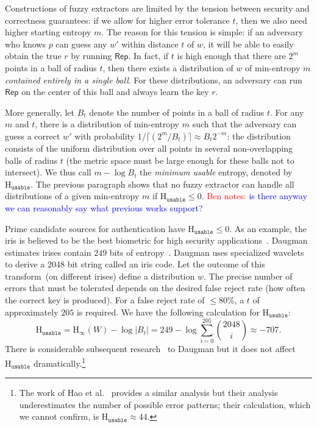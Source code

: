 \documentclass[11pt]{article}
\newcommand{\class}[1]{{\ensuremath{\mathsf{#1}}}}
\newcommand{\rep}{\ensuremath{\class{Rep}}\xspace}
\newcommand{\Hoo}{\mathrm{H}_\infty}
\newcommand{\Huse}{\mathrm{H}_{\mathtt{usable}}}
\newcommand{\authnote}[2]{{\textcolor{red}{\textsf{#1 notes: }\textcolor{blue}{ #2}}\marginpar{\textcolor{red}{\textbf{!!!!!}}}}}
\newcommand{\authnote}[2]{}
\newcommand{\bnote}[1]{{\authnote{Ben}{#1}}}
\begin{document}
Constructions of fuzzy extractors are limited by the tension between security and correctness guarantees: if we allow for higher error tolerance $t$, then we also need higher starting entropy $m$. The reason for this tension is simple: if an adversary who knows $p$ can guess any $w'$ within distance $t$ of $w$, it will be able to easily obtain the true $r$ by running $\rep$.
In fact, if $t$ is high enough that there are $2^m$ points in a ball of radius $t$, then there exists a distribution of $w$ of min-entropy $m$  \emph{contained entirely in a single ball}.  For these distributions, an adversary can run $\rep$ on the center of this ball and always learn the key $r$.


More generally, let $B_t$ denote the number of points in a ball of radius $t$. For any $m$ and $t$, there is a distribution of min-entropy $m$ such that the adversary can guess a correct $w'$ with probability $1/\lceil( 2^m/B_t) \rceil\approx B_t 2^{-m}$: the distribution consists of the uniform distribution over all points in several non-overlapping balls of radius $t$ (the metric space must be large enough for these balls not to intersect). We thus call $m-\log B_t$ the \emph{minimum usable} entropy, denoted by $\Huse$. The previous paragraph shows that  no fuzzy extractor can handle all distributions of a given min-entropy $m$ if  $\Huse\le 0$.
\bnote{is there anyway we can reasonably say what previous works support?}

Prime candidate sources for authentication have $\Huse\le 0$.  As an example, the iris is believed to be the best biometric for high security applications~\cite{prabhakar2003biometric}.  Daugman estimates irises contain $249$ bits of entropy~\cite{daugman2004}.  Daugman uses specialized wavelets to derive a $2048$ bit string called an iris code.  Let the outcome of this transform~(on different irises) define a distribution $w$.  The precise number of errors that must be tolerated depends on the desired false reject rate (how often the correct key is produced).  For a false reject rate of $\le 80\%$, a $t$ of approximately $205$ is required.  We have the following calculation for $\Huse$:
\[
\Huse = \Hoo(W) - \log |B_t|
= 249 - \log \sum_{i=0}^{205} {2048 \choose i} \approx -707.
\]
There is considerable subsequent research~\cite{gentile2009slic,gentile2009efficient,rathgeb2011combining} to Daugman but it does not affect $\Huse$ dramatically.\footnote{The work of Hao et al.~\cite[Section 4.3]{hao2006combining} provides a similar analysis but their analysis underestimates the number of possible error patterns; their calculation, which we cannot confirm, is $\Huse \approx 44$.}  
\end{document}
